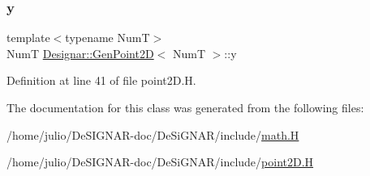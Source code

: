 \subsubsection{\texorpdfstring{y}{y}}
{\footnotesize\ttfamily template$<$typename NumT$>$ \\
NumT \hyperlink{class_designar_1_1_gen_point2_d}{Designar\+::\+Gen\+Point2D}$<$ NumT $>$\+::y\hspace{0.3cm}{\ttfamily [protected]}}



Definition at line 41 of file point2\+D.\+H.



The documentation for this class was generated from the following files\+:\begin{DoxyCompactItemize}
\item 
/home/julio/\+De\+S\+I\+G\+N\+A\+R-\/doc/\+De\+Si\+G\+N\+A\+R/include/\hyperlink{math_8_h}{math.\+H}\item 
/home/julio/\+De\+S\+I\+G\+N\+A\+R-\/doc/\+De\+Si\+G\+N\+A\+R/include/\hyperlink{point2_d_8_h}{point2\+D.\+H}\end{DoxyCompactItemize}
